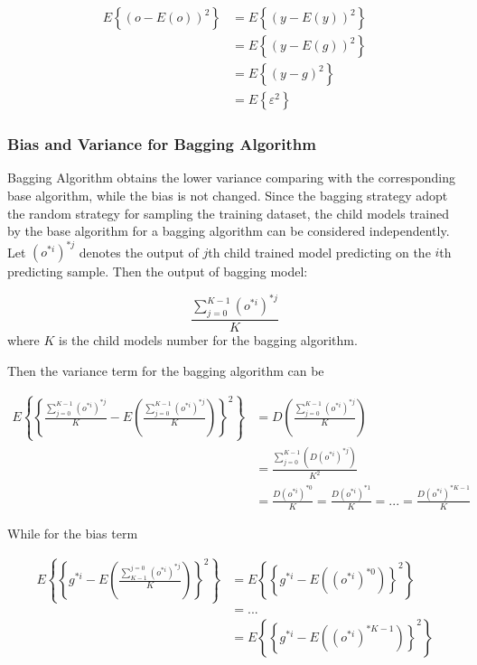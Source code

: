 \documentclass[runningheads,openany]{xhlPaper}
\begin{document}
\begin{displaymath}
\begin{aligned}
E\left \{ \left ( o - E\left ( o \right ) \right )^2 \right \}&=E\left \{ \left ( y - E\left ( y \right ) \right )^2 \right \}\\
&=E\left \{ \left ( y - E\left ( g \right ) \right )^2 \right \}\\
&=E\left \{ \left ( y - g\right )^2 \right \}\\
&=E\left \{ \varepsilon ^2 \right \}
\end{aligned}
\end{displaymath}

\subsubsection{Bias and Variance for Bagging Algorithm}
Bagging Algorithm obtains the lower variance comparing with the corresponding base algorithm, while the bias is not changed. Since the bagging strategy adopt the random strategy for sampling the training dataset, the child models trained by the base algorithm for a bagging algorithm can be considered independently. Let $\left(o^{*i} \right)^{*j}$ denotes the output of $j$th child trained model predicting on the $i$th predicting sample. Then the output of bagging model:

\begin{displaymath}
\frac{\sum_{j=0}^{K-1}\left ( o^{*i} \right )^{*j}}{K}
\end{displaymath}
where $K$ is the child models number for the bagging algorithm.

Then the variance term for the bagging algorithm can be 

\begin{displaymath}
\begin{aligned}
E\left \{ \left \{ \frac{\sum_{j=0}^{K-1}\left ( o^{*i} \right )^{*j}}{K}
 - E\left ( \frac{\sum_{j=0}^{K-1}\left ( o^{*i} \right )^{*j}}{K}
 \right ) \right \}^2 \right \}&=D(\frac{\sum_{j=0}^{K-1}\left ( o^{*i} \right )^{*j}}{K})\\
 &=\frac{\sum_{j=0}^{K-1}\left ( D(o^{*i})^{*j} \right )}{K^2}\\
 &=\frac{D(o^{*i})^{*0}}{K} = \frac{D(o^{*i})^{*1}}{K} = ... = \frac{D(o^{*i})^{*K-1}}{K}
\end{aligned}
\end{displaymath}

While for the bias term 

\begin{displaymath}
\begin{aligned}
E\left \{ \left \{ g^{*i} - E\left ( \frac{\sum_{K-1}^{j=0}\left ( o^{*i} \right )^{*j}}{K}
 \right ) \right \}^2 \right \}&=E\left \{ \left \{ g^{*i} - E\left ( \left ( o^{*i} \right )^{*0} \right ) \right \}^2 \right \}\\
 &=...\\
 &=E\left \{ \left \{ g^{*i} - E\left ( \left ( o^{*i} \right )^{*K-1} \right ) \right \}^2 \right \}
\end{aligned}
\end{displaymath}
\end{document}
